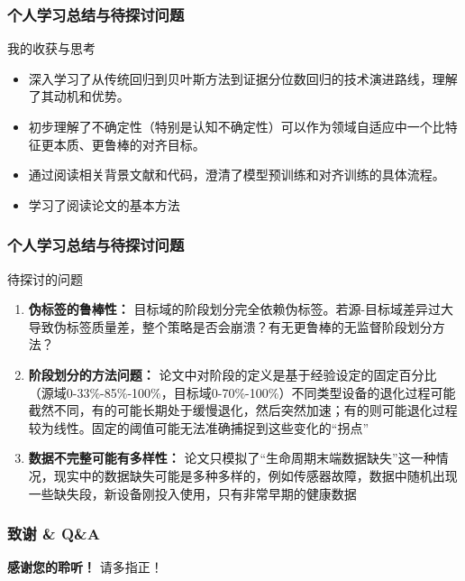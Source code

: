 \documentclass{beamer}
\begin{document}
\begin{frame}
    \frametitle{个人学习总结与待探讨问题}
    \begin{block}{我的收获与思考}
        \begin{itemize}
            \item 深入学习了从传统回归到贝叶斯方法到证据分位数回归的技术演进路线，理解了其动机和优势。
            \item 初步理解了不确定性（特别是认知不确定性）可以作为领域自适应中一个比特征更本质、更鲁棒的对齐目标。
            \item 通过阅读相关背景文献和代码，澄清了模型预训练和对齐训练的具体流程。
            \item 学习了阅读论文的基本方法
        \end{itemize}
    \end{block}
\end{frame}


\begin{frame}
    \frametitle{个人学习总结与待探讨问题}
    \begin{alertblock}{待探讨的问题}
        \begin{enumerate}
            \item \textbf{伪标签的鲁棒性：} 目标域的阶段划分完全依赖伪标签。若源-目标域差异过大导致伪标签质量差，整个策略是否会崩溃？有无更鲁棒的无监督阶段划分方法？
            \item \textbf{阶段划分的方法问题：} 论文中对阶段的定义是基于经验设定的固定百分比（源域0-33\%-85\%-100\%，目标域0-70\%-100\%）不同类型设备的退化过程可能截然不同，有的可能长期处于缓慢退化，然后突然加速；有的则可能退化过程较为线性。固定的阈值可能无法准确捕捉到这些变化的“拐点”
            \item \textbf{数据不完整可能有多样性：} 论文只模拟了“生命周期末端数据缺失”这一种情况，现实中的数据缺失可能是多种多样的，例如传感器故障，数据中随机出现一些缺失段，新设备刚投入使用，只有非常早期的健康数据
        \end{enumerate}
    \end{alertblock}
\end{frame}

\begin{frame}
    \frametitle{致谢 \& Q\&A}
    \vfill
    \centering
    \Huge \textbf{感谢您的聆听！}
    \vfill
    \Large 请多指正！
    \vfill
\end{frame}
\end{document}
